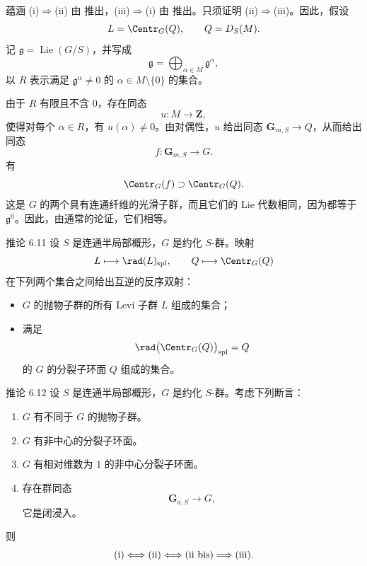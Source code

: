 蕴涵 \textup{(i)}\(\Rightarrow\)\textup{(ii)} 由  推出，\textup{(iii)}\(\Rightarrow\)\textup{(i)} 由  推出。只须证明 \textup{(ii)}\(\Rightarrow\)\textup{(iii)}。因此，假设
\[
 L=\Centr_G(Q),\qquad Q=D_S(M).
\]
记 \(\mathfrak g=\operatorname{Lie}(G/S)\)，并写成
\[
 \mathfrak g=\bigoplus_{\alpha\in M}\mathfrak g^\alpha,
\]
以 \(R\) 表示满足 \(\mathfrak g^\alpha\ne0\) 的 \(\alpha\in M\setminus\{0\}\) 的集合。

由于 \(R\) 有限且不含 \(0\)，存在同态
\[
 u:M\longrightarrow\mathbf Z,
\]
使得对每个 \(\alpha\in R\)，有 \(u(\alpha)\ne0\)。由对偶性，\(u\) 给出同态 \(\mathbf G_{m,S}\to Q\)，从而给出同态
\[
 f:\mathbf G_{m,S}\longrightarrow G.
\]
有
\[
 \Centr_G(f)\supset\Centr_G(Q).
\]
这是 \(G\) 的两个具有连通纤维的光滑子群，而且它们的 Lie 代数相同，因为都等于 \(\mathfrak g^0\)。因此，由通常的论证，它们相等。

\begin{sgastatement}{推论 6.11}
设 \(S\) 是连通半局部概形，\(G\) 是约化 \(S\)-群。映射
\[
 L\longmapsto\rad(L)_{\mathrm{spl}},
 \qquad
 Q\longmapsto\Centr_G(Q)
\]
在下列两个集合之间给出互逆的反序双射：
\begin{itemize}
\item \(G\) 的抛物子群的所有 Levi 子群 \(L\) 组成的集合；
\item 满足
\[
 \rad\bigl(\Centr_G(Q)\bigr)_{\mathrm{spl}}=Q
\]
的 \(G\) 的分裂子环面 \(Q\) 组成的集合。
\end{itemize}
\end{sgastatement}

\begin{sgastatement}{推论 6.12}
设 \(S\) 是连通半局部概形，\(G\) 是约化 \(S\)-群。考虑下列断言：
\begin{enumerate}[label=\textup{(\roman*)}]
\item \(G\) 有不同于 \(G\) 的抛物子群。
\item \(G\) 有非中心的分裂子环面。
\item[\textup{(ii bis)}] \(G\) 有相对维数为 \(1\) 的非中心分裂子环面。
\item 存在群同态
\[
 \mathbf G_{a,S}\longrightarrow G,
\]
它是闭浸入。
\end{enumerate}
则
\[
 \textup{(i)}
 \Longleftrightarrow\textup{(ii)}
 \Longleftrightarrow\textup{(ii bis)}
 \Longrightarrow\textup{(iii)}.
\]
\end{sgastatement}

